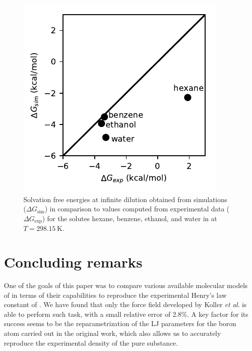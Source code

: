\documentclass[3p,twocolumn]{elsarticle}
\begin{document}

\begin{figure}
	\includegraphics[width=\linewidth]{delta_g_sim_exp}
	\caption{Solvation free energies at infinite dilution obtained from simulations ($\Delta G_\text{sim}$) in comparison to values computed from experimental data ($\Delta G_\text{exp}$) for the solutes hexane, benzene, ethanol, and water in \ce{[emim][B(CN)_4]}  at $T = 298.15~\text{K}$.}
	\label{fig:deltag_solutes}
\end{figure}

\section{Concluding remarks}
\label{sec:conclusion}

One of the goals of this paper was to compare various available molecular models of \ce{[emim][B(CN)_4]} in terms of their capabilities to reproduce the experimental Henry's law constant of .
We have found that only the force field developed by Koller \textit{et al}. \cite{Koller_2012} is able to perform such task, with a small relative error of 2.8\%.
A key factor for its success seems to be the reparametrization of the LJ parameters for the boron atom carried out in the original work, which also allows us to accurately reproduce the experimental density of the pure substance.
\end{document}
